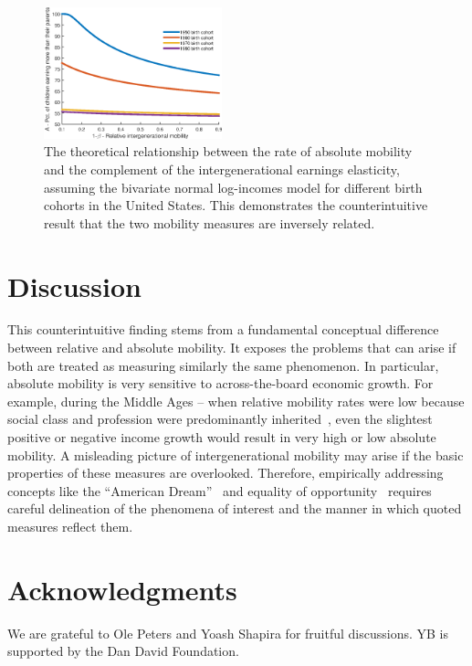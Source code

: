 \documentclass[final,10pt,5p,twocolumn,authoryear]{elsarticle}
\newcommand{\flabel}[1]{\label{fig:#1}}
\numberwithin{equation}{section}
\begin{document}
\begin{figure}[!htb]
\centering
\includegraphics[width=0.46\textwidth] {./figs/relat1.eps}
\caption{The theoretical relationship between the rate of absolute mobility and the complement of the intergenerational earnings elasticity, assuming the bivariate normal log-incomes model for different birth cohorts in the United States. This demonstrates the counterintuitive result that the two mobility measures are inversely related.}
\flabel{relat}
\end{figure}

\section{Discussion}

This counterintuitive finding stems from a fundamental conceptual difference between relative and absolute mobility. It exposes the problems that can arise if both are treated as measuring similarly the same phenomenon. In particular, absolute mobility is very sensitive to across-the-board economic growth. For example, during the Middle Ages -- when relative mobility rates were low because social class and profession were predominantly inherited~\citep{goldthorpe1982social,clark2014also}, even the slightest positive or negative income growth would result in very high or low absolute mobility. A misleading picture of intergenerational mobility may arise if the basic properties of these measures are overlooked. Therefore, empirically addressing concepts like the ``American Dream''~\citep{corak2009chasing,chetty2017fading} and equality of opportunity~\citep{roemer2000opportunity,chetty2014land} requires careful delineation of the phenomena of interest and the manner in which quoted measures reflect them.

\section*{Acknowledgments}
We are grateful to Ole Peters and Yoash Shapira for fruitful discussions. YB is supported by the Dan David Foundation.
\end{document}
